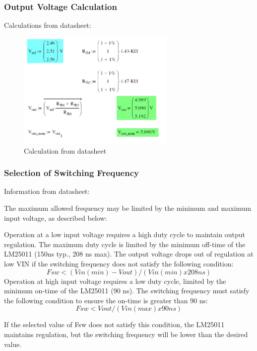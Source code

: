 \subsubsection{Output Voltage Calculation}
Calculations from datasheet:
\begin{figure}[htbp]
\begin{center}
\includegraphics[width=3in]{includes/DatasheetCalc}
\caption{Calculation from datasheet}
\end{center}
\end{figure}


\subsubsection{Selection of Switching Frequency}
Information from datasheet:

The maximum allowed frequency may be limited by the minimum and maximum input voltage, as described below:
\begin{outline}[enumerate]
\1 Operation at a low input voltage requires a high duty cycle to maintain output regulation. The maximum duty cycle is limited by the minimum off-time of the LM25011 (150ns typ., 208 ns max).  The output voltage drops out of regulation at low VIN if  the switching frequency does not satisfy the following condition:
\begin{equation}
Fsw < (Vin(min)-Vout) / ( Vin(min) x 208ns)
\end{equation}
\1 Operation at high input voltage requires a low duty cycle, limited by the minimum on-time of the LM25011 (90 ns). The switching frequency must satisfy the following condition to ensure the on-time is greater than 90 ns:
\begin{equation}
Fsw < Vout / (Vin(max) x 90ns)
\end{equation}
\end{outline}

If the selected value of Fsw does not satisfy this condition, the LM25011 maintains regulation, but the switching frequency will be lower than the desired value.

